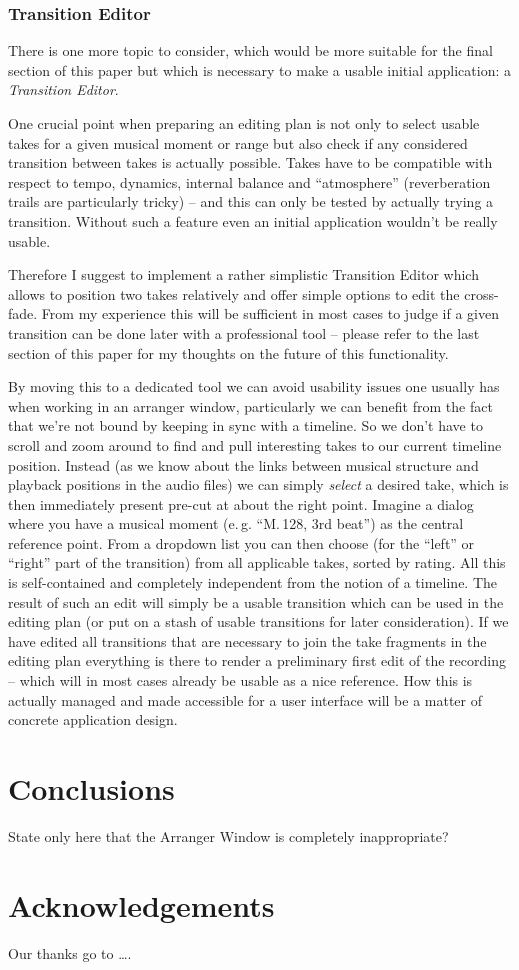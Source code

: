 \documentclass[11pt,a4paper]{article}
\begin{document}
\subsubsection{Transition Editor}
There is one more topic to consider, which would be more suitable for the final section of this paper but which is necessary to make a usable initial application: a \emph{Transition Editor}.

One crucial point when preparing an editing plan is not only to select usable takes for a given musical moment or range but also check if any considered transition between takes is actually possible.
Takes have to be compatible with respect to tempo, dynamics, internal balance and “atmosphere” (reverberation trails are particularly tricky) -- and this can only be tested by actually trying a transition.
Without such a feature even an initial application wouldn't be really usable.

Therefore I suggest to implement a rather simplistic Transition Editor which allows to position two takes relatively and offer simple options to edit the cross-fade.
From my experience this will be sufficient in most cases to judge if a given transition can be done later with a professional tool -- please refer to the last section of this paper for my thoughts on the future of this functionality.

By moving this to a dedicated tool we can avoid usability issues one usually has when working in an arranger window, particularly we can benefit from the fact that we're not bound by keeping in sync with a timeline.
So we don't have to scroll and zoom around to find and pull interesting takes to our current timeline position.
Instead (as we know about the links between musical structure and playback positions in the audio files) we can simply \emph{select} a desired take, which is then immediately present pre-cut at about the right point.
Imagine a dialog where you have a musical moment (e.\,g. “M.\,128, 3rd beat”) as the central reference point.
From a dropdown list you can then choose (for the “left” or “right” part of the transition) from all applicable takes, sorted by rating.
All this is self-contained and completely independent from the notion of a timeline.
The result of such an edit will simply be a usable transition which can be used in the editing plan (or put on a stash of usable transitions for later consideration).
If we have edited all transitions that are necessary to join the take fragments in the editing plan everything is there to render a preliminary first edit of the recording -- which will in most cases already be usable as a nice reference.
How this is actually managed and made accessible for a user interface will be a matter of concrete application design.



\section{Conclusions}

State only here that the Arranger Window is completely inappropriate?


\section{Acknowledgements}

Our thanks go to \ldots .
\end{document}

